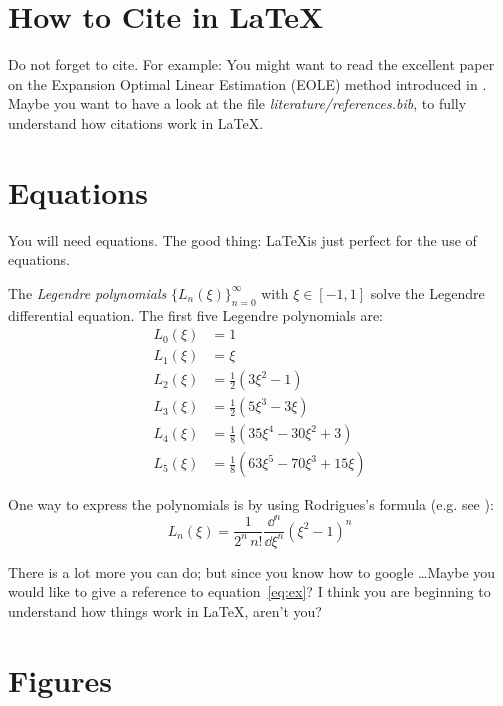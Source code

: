 \section{How to Cite in LaTeX}
\label{sec:fa_special_poly3}

Do not forget to cite. For example: You might want to read the excellent paper on the Expansion Optimal Linear Estimation (EOLE) method introduced in \cite{li_and_derkiureghian_1993}. Maybe you want to have a look at the file \emph{literature/references.bib}, to fully understand how citations work in LaTeX.

\section{Equations}

You will need equations. The good thing: \LaTeX is just perfect for the use of equations.

The \emph{Legendre polynomials} $\{L_n(\xi)\}_{n=0}^\infty$ with $\xi \in [-1,1]$ solve the Legendre differential equation. The first five Legendre polynomials are:
\begin{align}
  L_0(\xi) &= 1  \nonumber \\
  L_1(\xi) &= \xi  \nonumber \\
  L_2(\xi) &= \frac{1}{2}\left(3\xi^2-1\right) \nonumber \\
  L_3(\xi) &= \frac{1}{2}\left(5\xi^3-3\xi\right) \nonumber \\
  L_4(\xi) &= \frac{1}{8}\left(35\xi^4-30\xi^2+3\right) \nonumber \\
  L_5(\xi) &= \frac{1}{8}\left(63\xi^5-70\xi^3+15\xi\right)
\end{align}

One way to express the polynomials is by using Rodrigues's formula (e.g. see \cite{arens_2009}):
\begin{equation}
  L_n(\xi) = \frac{1}{2^n \, n!}\frac{\dd^n}{\dd \xi^n} (\xi^2-1)^n
  \label{eq:ex}
\end{equation}

There is a lot more you can do; but since you know how to google \ldots Maybe you would like to give a reference to equation~\ref{eq:ex}? I think you are beginning to understand how things work in LaTeX, aren't you?

\section{Figures}
\label{ssec:fa_lagrange_poly}

